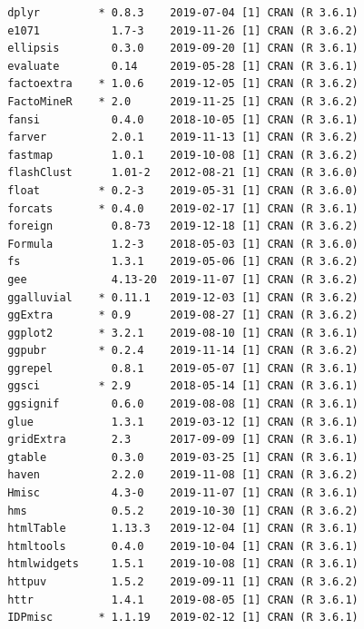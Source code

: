 \documentclass[12pt,twoside]{reedthesis}
\begin{document}
\begin{verbatim}
 dplyr         * 0.8.3    2019-07-04 [1] CRAN (R 3.6.1)                    
 e1071           1.7-3    2019-11-26 [1] CRAN (R 3.6.2)                    
 ellipsis        0.3.0    2019-09-20 [1] CRAN (R 3.6.1)                    
 evaluate        0.14     2019-05-28 [1] CRAN (R 3.6.1)                    
 factoextra    * 1.0.6    2019-12-05 [1] CRAN (R 3.6.2)                    
 FactoMineR    * 2.0      2019-11-25 [1] CRAN (R 3.6.2)                    
 fansi           0.4.0    2018-10-05 [1] CRAN (R 3.6.1)                    
 farver          2.0.1    2019-11-13 [1] CRAN (R 3.6.2)                    
 fastmap         1.0.1    2019-10-08 [1] CRAN (R 3.6.2)                    
 flashClust      1.01-2   2012-08-21 [1] CRAN (R 3.6.0)                    
 float         * 0.2-3    2019-05-31 [1] CRAN (R 3.6.0)                    
 forcats       * 0.4.0    2019-02-17 [1] CRAN (R 3.6.1)                    
 foreign         0.8-73   2019-12-18 [1] CRAN (R 3.6.2)                    
 Formula         1.2-3    2018-05-03 [1] CRAN (R 3.6.0)                    
 fs              1.3.1    2019-05-06 [1] CRAN (R 3.6.2)                    
 gee             4.13-20  2019-11-07 [1] CRAN (R 3.6.2)                    
 ggalluvial    * 0.11.1   2019-12-03 [1] CRAN (R 3.6.2)                    
 ggExtra       * 0.9      2019-08-27 [1] CRAN (R 3.6.2)                    
 ggplot2       * 3.2.1    2019-08-10 [1] CRAN (R 3.6.1)                    
 ggpubr        * 0.2.4    2019-11-14 [1] CRAN (R 3.6.2)                    
 ggrepel         0.8.1    2019-05-07 [1] CRAN (R 3.6.1)                    
 ggsci         * 2.9      2018-05-14 [1] CRAN (R 3.6.1)                    
 ggsignif        0.6.0    2019-08-08 [1] CRAN (R 3.6.1)                    
 glue            1.3.1    2019-03-12 [1] CRAN (R 3.6.1)                    
 gridExtra       2.3      2017-09-09 [1] CRAN (R 3.6.1)                    
 gtable          0.3.0    2019-03-25 [1] CRAN (R 3.6.1)                    
 haven           2.2.0    2019-11-08 [1] CRAN (R 3.6.2)                    
 Hmisc           4.3-0    2019-11-07 [1] CRAN (R 3.6.1)                    
 hms             0.5.2    2019-10-30 [1] CRAN (R 3.6.2)                    
 htmlTable       1.13.3   2019-12-04 [1] CRAN (R 3.6.1)                    
 htmltools       0.4.0    2019-10-04 [1] CRAN (R 3.6.1)                    
 htmlwidgets     1.5.1    2019-10-08 [1] CRAN (R 3.6.1)                    
 httpuv          1.5.2    2019-09-11 [1] CRAN (R 3.6.2)                    
 httr            1.4.1    2019-08-05 [1] CRAN (R 3.6.1)                    
 IDPmisc       * 1.1.19   2019-02-12 [1] CRAN (R 3.6.1)                    

\end{verbatim}
\end{document}
